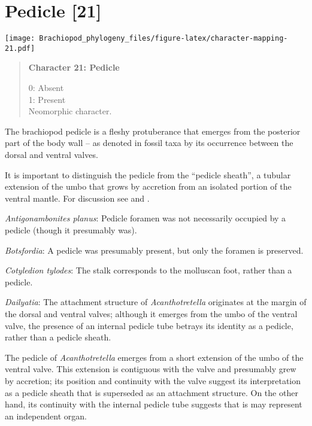 \documentclass[openany]{book}
\theoremstyle{definition}
\theoremstyle{definition}
\theoremstyle{definition}
\theoremstyle{remark}
\begin{document}
\section{Pedicle {[}21{]}}\label{pedicle-21}

\texttt{[image: Brachiopod\_phylogeny\_files/figure-latex/character-mapping-21.pdf]}

\begin{quote}
\textbf{Character 21: Pedicle}

0: Absent\\
1: Present\\
Neomorphic character.
\end{quote}

The brachiopod pedicle is a fleshy protuberance that emerges from the
posterior part of the body wall -- as denoted in fossil taxa by its
occurrence between the dorsal and ventral valves.

It is important to distinguish the pedicle from the ``pedicle sheath'',
a tubular extension of the umbo that grows by accretion from an isolated
portion of the ventral mantle. For discussion see
\citet{Holmer2018Theattachment} and \citet{Bassett2017Earliestontogeny}.

\hypertarget{Antigonambonites_planus-coding-21}{}
\emph{Antigonambonites planus}: Pedicle foramen was not necessarily
occupied by a pedicle (though it presumably was).

\hypertarget{Botsfordia-coding-21}{}
\emph{Botsfordia}: A pedicle was presumably present, but only the
foramen is preserved.

\hypertarget{Cotyledion_tylodes-coding-21}{}
\emph{Cotyledion tylodes}: The stalk corresponds to the molluscan foot,
rather than a pedicle.

\hypertarget{Dailyatia-coding-21}{}
\emph{Dailyatia}: The attachment structure of \emph{Acanthotretella}
originates at the margin of the dorsal and ventral valves; although it
emerges from the umbo of the ventral valve, the presence of an internal
pedicle tube betrays its identity as a pedicle, rather than a pedicle
sheath.

The pedicle of \emph{Acanthotretella} emerges from a short extension of
the umbo of the ventral valve. This extension is contiguous with the
valve and presumably grew by accretion; its position and continuity with
the valve suggest its interpretation as a pedicle sheath that is
superseded as an attachment structure. On the other hand, its continuity
with the internal pedicle tube suggests that is may represent an
independent organ.
\end{document}
